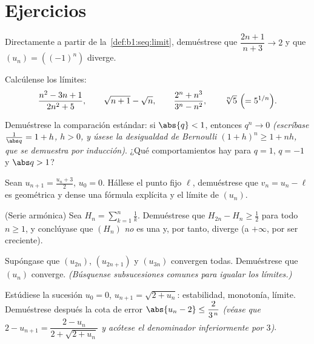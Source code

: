 \section{Ejercicios}

\begin{exercise}[$\star$]\label{exo:b1:seq:1}
Directamente a partir de la~\cref{def:b1:seq:limit}, demuéstrese que
$\dfrac{2n+1}{n+3} \to 2$ y que $(u_n) = ((-1)^n)$ diverge.
\end{exercise}

\begin{exercise}[$\star$]\label{exo:b1:seq:2}
Calcúlense los límites:
\[
\frac{n^2 - 3n + 1}{2n^2 + 5},
\qquad
\sqrt{n+1} - \sqrt n,
\qquad
\frac{2^n + n^3}{3^n - n^2},
\qquad
\sqrt[n]{5}\ \Bigl(= 5^{1/n}\Bigr).
\]
\end{exercise}

\begin{exercise}[$\star$]\label{exo:b1:seq:3}
Demuéstrese la comparación estándar: si $\abs{q} < 1$, entonces
$q^n \to 0$ \emph{(escríbase $\frac{1}{\abs q} = 1 + h$, $h > 0$, y
úsese la desigualdad de Bernoulli $(1+h)^n \geq 1 + nh$, que se
demuestra por inducción)}. ¿Qué comportamientos hay para $q = 1$,
$q = -1$ y $\abs q > 1$?
\end{exercise}

\begin{exercise}[$\star$]\label{exo:b1:seq:4}
Sean $u_{n+1} = \frac{u_n + 3}{2}$, $u_0 = 0$. Hállese el punto fijo
$\ell$, demuéstrese que $v_n = u_n - \ell$ es geométrica y dense una
fórmula explícita y el límite de $(u_n)$.
\end{exercise}

\begin{exercise}[$\star\star$]\label{exo:b1:seq:5}
(Serie armónica) Sea $H_n = \sum_{k=1}^{n} \frac 1k$. Demuéstrese que
$H_{2n} - H_n \geq \frac12$ para todo $n \geq 1$, y conclúyase que
$(H_n)$ \emph{no} es una  y, por tanto, diverge (a
$+\infty$, por ser creciente).
\end{exercise}

\begin{exercise}[$\star\star$]\label{exo:b1:seq:6}
Supóngase que $(u_{2n})$, $(u_{2n+1})$ y $(u_{3n})$ convergen todas.
Demuéstrese que $(u_n)$ converge. \emph{(Búsquense subsucesiones
comunes para igualar los límites.)}
\end{exercise}

\begin{exercise}[$\star\star$]\label{exo:b1:seq:7}
Estúdiese la sucesión $u_0 = 0$, $u_{n+1} = \sqrt{2 + u_n}$:
estabilidad, monotonía, límite. Demuéstrese después la cota de error
$\abs{u_n - 2} \leq \dfrac{2}{3^{\,n}}$ \emph{(véase que
$2 - u_{n+1} = \dfrac{2 - u_n}{2 + \sqrt{2 + u_n}}$ y acótese el
denominador inferiormente por $3$)}.
\end{exercise}

